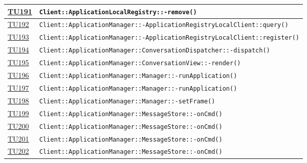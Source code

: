 \begin{longtable}{|>{\centering}m{1cm}|m{12cm}<{\centering}|}
\hyperlink{TU191}{TU191} & \texttt{Client::ApplicationLocalRegistry::-\linebreak remove()}\\ \hline

\hyperlink{TU192}{TU192} & \texttt{Client::ApplicationManager::-\linebreak ApplicationRegistryLocalClient::query()}\\ \hline

\hyperlink{TU193}{TU193} & \texttt{Client::ApplicationManager::-\linebreak ApplicationRegistryLocalClient::register()}\\ \hline

\hyperlink{TU194}{TU194} & \texttt{Client::ApplicationManager::ConversationDispatcher::-\linebreak dispatch()}\\ \hline

\hyperlink{TU195}{TU195} & \texttt{Client::ApplicationManager::ConversationView::-\linebreak render()}\\ \hline

\hyperlink{TU196}{TU196} & \texttt{Client::ApplicationManager::Manager::-\linebreak runApplication()}\\ \hline

\hyperlink{TU197}{TU197} & \texttt{Client::ApplicationManager::Manager::-\linebreak runApplication()}\\ \hline

\hyperlink{TU198}{TU198} & \texttt{Client::ApplicationManager::Manager::-\linebreak setFrame()}\\ \hline

\hyperlink{TU199}{TU199} & \texttt{Client::ApplicationManager::MessageStore::-\linebreak onCmd()}\\ \hline

\hyperlink{TU200}{TU200} & \texttt{Client::ApplicationManager::MessageStore::-\linebreak onCmd()}\\ \hline

\hyperlink{TU201}{TU201} & \texttt{Client::ApplicationManager::MessageStore::-\linebreak onCmd()}\\ \hline

\hyperlink{TU202}{TU202} & \texttt{Client::ApplicationManager::MessageStore::-\linebreak onCmd()}\\ \hline


\end{longtable}
